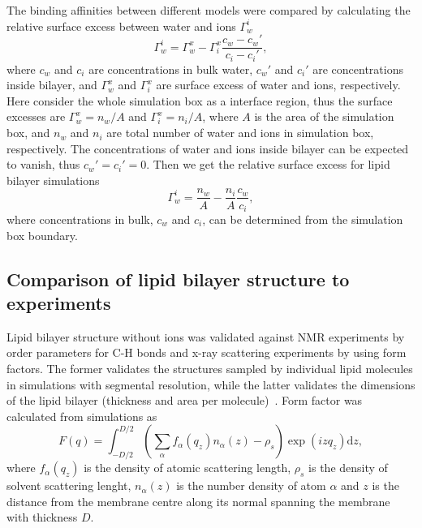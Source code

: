 \documentclass[aip,jcp,twocolumn]{revtex4}
\begin{document}
The binding affinities between different models were compared by calculating
the relative surface excess between water and ions $\Gamma_w^i$ \cite{chattorajBOOK}
\begin{equation}
  \Gamma_w^i=\Gamma_w^x-\Gamma_i^x\frac{c_w-c_w'}{c_i-c_i'},
\end{equation}
where $c_w$ and $c_i$ are concentrations in bulk water, 
$c_w'$ and $c_i'$ are concentrations inside bilayer, and
$\Gamma_w^x$ and $\Gamma_i^x$ are surface excess of water and
ions, respectively. Here consider the whole simulation box
as a interface region, thus the surface excesses
are $\Gamma_w^x=n_w/A$ and $\Gamma_i^x=n_i/A$, where
$A$ is the area of the simulation box, and $n_w$ and
$n_i$ are total number of water and ions in simulation box,
respectively. The concentrations of water and ions inside
bilayer can be expected to vanish, thus $c_w'=c_i'=0$.
Then we get the relative surface excess for lipid bilayer
simulations
\begin{equation}\label{surfexcess}
  \Gamma_w^i=\frac{n_w}{A}-\frac{n_i}{A}\frac{c_w}{c_i},
\end{equation}
where concentrations in bulk, $c_w$ and $c_i$, can be determined
from the simulation box boundary.

\subsection{Comparison of lipid bilayer structure to experiments}

Lipid bilayer structure without ions was validated against NMR experiments
by order parameters for C-H bonds and x-ray scattering experiments by using
form factors. The former validates the structures sampled by individual
lipid molecules in simulations with segmental resolution, while the latter
validates the dimensions of the lipid bilayer (thickness and area per
molecule)~\cite{ollila16}. Form factor was calculated from simulations
as 
\begin{equation}
  F(q) = \int _{-D/2} ^{D/2} \left ( \sum _\alpha f_\alpha (q_z) n_\alpha (z) - \rho _s \right ) \exp (izq_z) \mathrm{d}z,
\end{equation}
where $f_\alpha(q_z)$ is the density of atomic scattering length, 
$\rho_s$ is the density of solvent scattering lenght,
$n_\alpha (z)$ is the number density of atom $\alpha$ and
$z$ is the distance from the membrane centre along its normal 
spanning the membrane with thickness $D$. 
\end{document}
